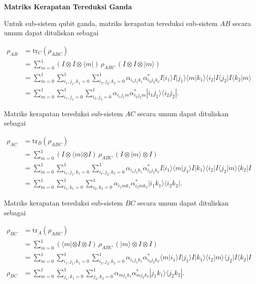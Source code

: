 \textbf{Matriks Kerapatan Tereduksi Ganda}
\par
Untuk sub-sistem qubit ganda, matriks kerapatan tereduksi sub-sistem $AB$ secara umum dapat dituliskan sebagai

\begin{align}
	\rho_{AB} &= \mathrm{tr}_C(\rho_{ABC}) \nonumber \\
	&= \sum_{m=0}^{1} (I \otimes I \otimes \langle m|)\, \rho_{ABC}\, (I \otimes I \otimes |m\rangle) \nonumber \\
	&= \sum_{m=0}^{1} \sum_{i_1,j_1,k_1=0}^{1} \sum_{i_2,j_2,k_2=0}^{1}
	\alpha_{i_1 j_1 k_1}\alpha^{*}_{i_2 j_2 k_2}
	I |i_1\rangle I |j_1\rangle \langle m|k_1\rangle
	\langle i_2| I \langle j_2| I \langle k_2|m\rangle \nonumber \\
	&= \sum_{m=0}^{1} \sum_{i_1,j_1=0}^{1} \sum_{i_2,j_2=0}^{1}
	\alpha_{i_1 j_1 m}\alpha^{*}_{i_2 j_2 m}
	|i_1 j_1\rangle \langle i_2 j_2|\label{rhoAB3qubit}.
\end{align}

Matriks kerapatan tereduksi sub-sistem $AC$ secara umum dapat dituliskan sebagai

\begin{align}
	\rho_{AC} &= \mathrm{tr}_B(\rho_{ABC}) \nonumber \\
	&= \sum_{m=0}^{1} (I \otimes \langle m| \otimes I)\, \rho_{ABC}\, (I \otimes |m\rangle \otimes I) \nonumber \\
	&= \sum_{m=0}^{1} \sum_{i_1,j_1,k_1=0}^{1} \sum_{i_2,j_2,k_2=0}^{1}
	\alpha_{i_1 j_1 k_1}\alpha^{*}_{i_2 j_2 k_2}
	I |i_1\rangle \langle m|j_1\rangle I |k_1\rangle
	\langle i_2| I \langle j_2|m\rangle \langle k_2| I \nonumber \\
	&= \sum_{m=0}^{1} \sum_{i_1,k_1=0}^{1} \sum_{i_2,k_2=0}^{1}
	\alpha_{i_1 m k_1}\alpha^{*}_{i_2 m k_2}
	|i_1 k_1\rangle \langle i_2 k_2|\label{rhoAC3qubit}.
\end{align}

Matriks kerapatan tereduksi sub-sistem $BC$ secara umum dapat dituliskan sebagai

\begin{align}
	\rho_{BC} &= \mathrm{tr}_A(\rho_{ABC}) \nonumber \\
	&= \sum_{m=0}^{1} (\langle m| \otimes I \otimes I)\, \rho_{ABC}\, (|m\rangle \otimes I \otimes I) \nonumber \\
	&= \sum_{m=0}^{1} \sum_{i_1,j_1,k_1=0}^{1} \sum_{i_2,j_2,k_2=0}^{1}
	\alpha_{i_1 j_1 k_1}\alpha^{*}_{i_2 j_2 k_2}
	\langle m|i_1\rangle I |j_1\rangle I |k_1\rangle
	\langle i_2|m\rangle \langle j_2| I \langle k_2| I \nonumber \\
	\rho_{BC} &= \sum_{m=0}^{1} \sum_{j_1,k_1=0}^{1} \sum_{j_2,k_2=0}^{1}
	\alpha_{m j_1 k_1}\alpha^{*}_{m j_2 k_2}
	|j_1 k_1\rangle \langle j_2 k_2|\label{rhoBC3qubit}.
\end{align}


